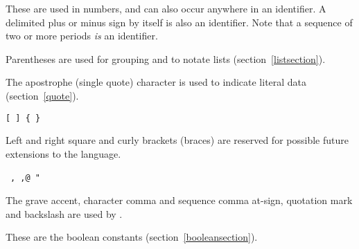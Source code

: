 \begin{description}{}{}

\item[{\tt.\ + -}]
These are used in numbers, and can also occur anywhere in an identifier.
A delimited plus or minus sign by itself
is also an identifier.
Note that a sequence of two or more periods {\em is} an identifier.

\item[\tt( )]
Parentheses are used for grouping and to notate lists
(section~\ref{listsection}).

\item[\singlequote]
The apostrophe (single quote) character is used to indicate literal data (section~\ref{quote}).

\hbox{\tt \verb"[" \verb"]" \verb"{" \verb"}"}
\item[\copy0]
Left and right square and curly brackets (braces)
are reserved for possible future extensions to the language.

\hbox{\backquote \ \tt, ,@ \tt" \backwhack}
\item[\copy0]
The grave accent,
character comma and sequence comma at-sign, quotation mark and
backslash are used by \rsevenrs.

\item[\schtrue{} \schfalse{}]
  These are the boolean constants (section~\ref{booleansection}).

\end{description}

